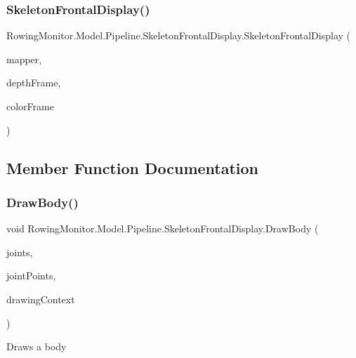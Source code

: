 \subsubsection{\texorpdfstring{Skeleton\+Frontal\+Display()}{SkeletonFrontalDisplay()}}
{\footnotesize\ttfamily Rowing\+Monitor.\+Model.\+Pipeline.\+Skeleton\+Frontal\+Display.\+Skeleton\+Frontal\+Display (\begin{DoxyParamCaption}\item[{Coordinate\+Mapper}]{mapper,  }\item[{Frame\+Description}]{depth\+Frame,  }\item[{Frame\+Description}]{color\+Frame }\end{DoxyParamCaption})}



\subsection{Member Function Documentation}
\mbox{\label{class_rowing_monitor_1_1_model_1_1_pipeline_1_1_skeleton_frontal_display_a4f24762b003e94837e955d31f81c0499}} 
\subsubsection{\texorpdfstring{Draw\+Body()}{DrawBody()}}
{\footnotesize\ttfamily void Rowing\+Monitor.\+Model.\+Pipeline.\+Skeleton\+Frontal\+Display.\+Draw\+Body (\begin{DoxyParamCaption}\item[{I\+Read\+Only\+Dictionary$<$ Joint\+Type, Joint $>$}]{joints,  }\item[{I\+Dictionary$<$ Joint\+Type, Point $>$}]{joint\+Points,  }\item[{Drawing\+Context}]{drawing\+Context }\end{DoxyParamCaption})\hspace{0.3cm}{\ttfamily [protected]}}



Draws a body 


